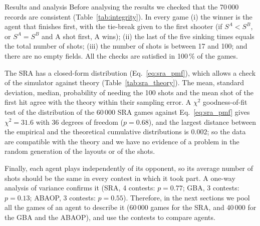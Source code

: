 \documentclass[letterpaper,11pt]{article} %
\renewcommand{\arraystretch}{1.8}
\begin{document}
\begin{Resultados}{Results and analysis}
Before analysing the results we checked that the 70\,000 records are consistent (Table~\ref{tab:integrity}). In every game (i) the winner is the agent that finishes first, with the tie-break given to the first shooter (if $S^A<S^B$, or $S^A=S^B$ and A shot first, A wins); (ii) the last of the five sinking times equals the total number of shots; (iii) the number of shots is between 17 and 100; and there are no empty fields. All the checks are satisfied in 100\,\% of the games.

\begin{table}[H]
    \centering
    \small
    \renewcommand{\arraystretch}{1.35}
    \resizebox{\linewidth}{!}{}
    \caption{Consistency checks of the data (percentage of games that satisfy each check).}
    \label{tab:integrity}
\end{table}

The SRA has a closed-form distribution (Eq.~\eqref{eq:sra_pmf}), which allows a check of the simulator against theory (Table~\ref{tab:sra_theory}). The mean, standard deviation, median, probability of needing the 100 shots and the mean shot of the first hit agree with the theory within their sampling error. A $\chi^2$ goodness-of-fit test of the distribution of the 60\,000 SRA games against Eq.~\eqref{eq:sra_pmf} gives $\chi^2=31.6$ with 36 degrees of freedom ($p=0.68$), and the largest distance between the empirical and the theoretical cumulative distributions is $0.002$; so the data are compatible with the theory and we have no evidence of a problem in the random generation of the layouts or of the shots.

\begin{table}[H]
    \centering
    \renewcommand{\arraystretch}{1.4}
    
    \caption{Simple Reflex Agent: closed-form theory (Eqs.~\eqref{eq:sra_pmf}--\eqref{eq:sra_moments} and $E[F]=(N+1)/(K+1)$ for the first hit) against the simulation.}
    \label{tab:sra_theory}
\end{table}

Finally, each agent plays independently of its opponent, so its average number of shots should be the same in every contest in which it took part. A one-way analysis of variance confirms it (SRA, 4 contests: $p=0.77$; GBA, 3 contests: $p=0.13$; ABAOP, 3 contests: $p=0.55$). Therefore, in the next sections we pool all the games of an agent to describe it (60\,000 games for the SRA, and 40\,000 for the GBA and the ABAOP), and use the contests to compare agents.


\end{Resultados}
\end{document}
